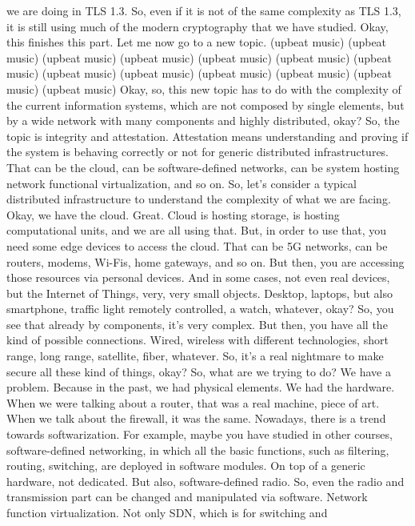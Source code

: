  we are doing in TLS 1.3. So, even if it is not of the same complexity as TLS
 1.3, it is still using much of the modern cryptography that we have studied.
 Okay, this finishes this part. Let me now go to a new topic. (upbeat music)
 (upbeat music) (upbeat music) (upbeat music) (upbeat music) (upbeat music)
 (upbeat music) (upbeat music) (upbeat music) (upbeat music) (upbeat music)
 (upbeat music) (upbeat music) Okay, so, this new topic has to do with the
 complexity of the current information systems, which are not composed by
 single elements, but by a wide network with many components and highly
 distributed, okay? So, the topic is integrity and attestation. Attestation
 means understanding and proving if the system is behaving correctly or not for
 generic distributed infrastructures. That can be the cloud, can be
 software-defined networks, can be system hosting network functional
 virtualization, and so on. So, let's consider a typical distributed
 infrastructure to understand the complexity of what we are facing. Okay, we
 have the cloud. Great. Cloud is hosting storage, is hosting computational
 units, and we are all using that. But, in order to use that, you need some
 edge devices to access the cloud. That can be 5G networks, can be routers,
 modems, Wi-Fis, home gateways, and so on. But then, you are accessing those
 resources via personal devices. And in some cases, not even real devices, but
 the Internet of Things, very, very small objects. Desktop, laptops, but also
 smartphone, traffic light remotely controlled, a watch, whatever, okay? So,
 you see that already by components, it's very complex. But then, you have all
 the kind of possible connections. Wired, wireless with different technologies,
 short range, long range, satellite, fiber, whatever. So, it's a real nightmare
 to make secure all these kind of things, okay? So, what are we trying to do?
 We have a problem. Because in the past, we had physical elements. We had the
 hardware. When we were talking about a router, that was a real machine, piece
 of art. When we talk about the firewall, it was the same. Nowadays, there is a
 trend towards softwarization. For example, maybe you have studied in other
 courses, software-defined networking, in which all the basic functions, such
 as filtering, routing, switching, are deployed in software modules. On top of
 a generic hardware, not dedicated. But also, software-defined radio. So, even
 the radio and transmission part can be changed and manipulated via software.
 Network function virtualization. Not only SDN, which is for switching and
